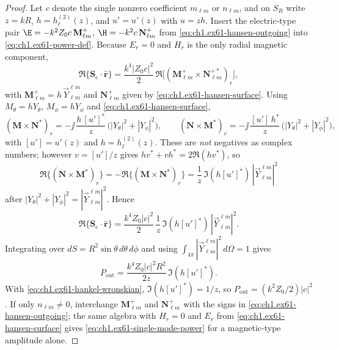 \begin{proof}
Let $c$ denote the single nonzero coefficient $m_{\ell m}$ or $n_{\ell m}$, and on $S_R$ write $z=kR$, $h=h_\ell^{(2)}(z)$, and $u'=u'(z)$ with $u=zh$. Insert the electric-type pair $\E=-k^2 Z_0 c\,\mathbf M_{\ell m}^+$, $\H=-k^2 c\,\mathbf N_{\ell m}^+$ from \eqref{eq:ch1.ex61-hansen-outgoing} into \eqref{eq:ch1.ex61-power-def}. Because $E_r=0$ and $H_r$ is the only radial magnetic component,
\[
\Re\{\mathbf S_\mathrm{c}\cdot\hat{\mathbf r}\}
=\frac{k^4|Z_0 c|^2}{2}\,\Re\bigl[(\mathbf M_{\ell m}^+\times\mathbf N_{\ell m}^{+*})_r\bigr],
\]
with $\mathbf M_{\ell m}^+=h\,\vec Y_{\ell m}^{\ell m}$ and $\mathbf N_{\ell m}^+$ given by \eqref{eq:ch1.ex61-hansen-surface}. Using $M_\theta=hY_\theta$, $M_\phi=hY_\phi$ and \eqref{eq:ch1.ex61-hansen-surface},
\[
(\mathbf M\times\mathbf N^*)_r
=-\jj\,\frac{h\,[u']^*}{z}\,\bigl(|Y_\theta|^2+|Y_\phi|^2\bigr),
\qquad
(\mathbf N\times\mathbf M^*)_r
=-\jj\,\frac{[u']\,h^*}{z}\,\bigl(|Y_\theta|^2+|Y_\phi|^2\bigr),
\]
with $[u']=u'(z)$ and $h=h_\ell^{(2)}(z)$. These are \emph{not} negatives as complex numbers; however $v=[u']/z$ gives $h v^*+v h^*=2\Re(h v^*)$, so
\[
\Re\{(\mathbf N\times\mathbf M^*)_r\}=-\Re\{(\mathbf M\times\mathbf N^*)_r\}
=\frac{1}{z}\,\Im(h[u']^*)\,|\vec Y_{\ell m}^{\ell m}|^2
\]
after $|Y_\theta|^2+|Y_\phi|^2=|\vec Y_{\ell m}^{\ell m}|^2$. Hence
\[
\Re\{\mathbf S_\mathrm{c}\cdot\hat{\mathbf r}\}
=\frac{k^4 Z_0 |c|^2}{2}\,\frac{1}{z}\,\Im(h[u']^*)\,|\vec Y_{\ell m}^{\ell m}|^2.
\]
Integrating over $dS=R^2\sin\theta\,d\theta\,d\phi$ and using $\int_{4\pi}|\vec Y_{\ell m}^{\ell m}|^2\,d\Omega=1$ gives
\[
P_{\mathrm{out}}=\frac{k^4 Z_0 |c|^2 R^2}{2z}\,\Im(h[u']^*).
\]
With \eqref{eq:ch1.ex61-hankel-wronskian}, $\Im(h[u']^*)=1/z$, so $P_{\mathrm{out}}=(k^2 Z_0/2)|c|^2$.
If only $n_{\ell m}\neq0$, interchange $\mathbf M_{\ell m}^+$ and $\mathbf N_{\ell m}^+$ with the signs in \eqref{eq:ch1.ex61-hansen-outgoing}; the same algebra with $H_r=0$ and $E_r$ from \eqref{eq:ch1.ex61-hansen-surface} gives \eqref{eq:ch1.ex61-single-mode-power} for a magnetic-type amplitude alone.


\end{proof}
